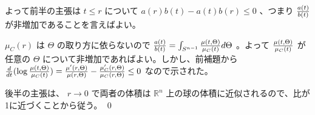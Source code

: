 \documentclass[dvipdfmx,a4paper]{jsreport}
\theoremstyle{definition}
\newcommand{\R}{\mathbb{R}}
\begin{document}
よって前半の主張は $t \leq r$ について $a(r)b(t)-a(t)b(r) \leq 0$ 、つまり ${a(t) \over b(t)}$ が非増加であることを言えばよい。

$\mu_C(r)$ は $\Theta$ の取り方に依らないので ${a(t) \over b(t)}=\int_{S^{n-1}} {\mu(t,\Theta) \over \mu_C(t)}d\Theta$ 。よって ${\mu(t,\Theta) \over \mu_C(t)}$ が任意の $\Theta$ について非増加であればよい。しかし、前補題から ${d \over dt}(\log {\mu(t,\Theta) \over \mu_C(t)}) ={\mu'(r,\Theta) \over \mu(r,\Theta)}-{\mu_C'(r,\Theta) \over \mu_C(r,\Theta)} \leq 0$ なので示された。

後半の主張は、 $r \to 0$ で両者の体積は $\R^n$ 上の球の体積に近似されるので、比が1に近づくことから従う。 \qed 










\end{document}
